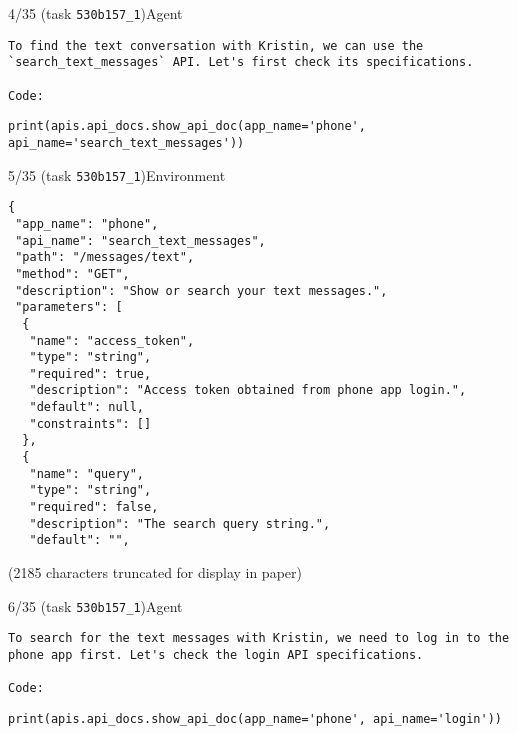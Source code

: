 \begin{minipage}{0.95\linewidth}
\begin{assistant_message_box}{{4/35 (task \texttt{530b157\_1})\hfill Agent}}
\scriptsize
\begin{Verbatim}[breaklines]
To find the text conversation with Kristin, we can use the `search_text_messages` API. Let's first check its specifications.

Code:
\end{Verbatim}
\begin{tcolorbox}[colback=codebgcolor,boxrule=0pt]\begin{Verbatim}[breaklines]
print(apis.api_docs.show_api_doc(app_name='phone', api_name='search_text_messages'))
\end{Verbatim}
\end{tcolorbox}\end{assistant_message_box}
\end{minipage}

\hspace*{8mm}%
\begin{minipage}{0.95\linewidth}
\begin{user_message_box}{{5/35 (task \texttt{530b157\_1})\hfill Environment}}
\scriptsize
\begin{Verbatim}[breaklines]
{
 "app_name": "phone",
 "api_name": "search_text_messages",
 "path": "/messages/text",
 "method": "GET",
 "description": "Show or search your text messages.",
 "parameters": [
  {
   "name": "access_token",
   "type": "string",
   "required": true,
   "description": "Access token obtained from phone app login.",
   "default": null,
   "constraints": []
  },
  {
   "name": "query",
   "type": "string",
   "required": false,
   "description": "The search query string.",
   "default": "",
\end{Verbatim}
(2185 characters truncated for display in paper)\end{user_message_box}
\end{minipage}

\begin{minipage}{0.95\linewidth}
\begin{assistant_message_box}{{6/35 (task \texttt{530b157\_1})\hfill Agent}}
\scriptsize
\begin{Verbatim}[breaklines]
To search for the text messages with Kristin, we need to log in to the phone app first. Let's check the login API specifications.

Code:
\end{Verbatim}
\begin{tcolorbox}[colback=codebgcolor,boxrule=0pt]\begin{Verbatim}[breaklines]
print(apis.api_docs.show_api_doc(app_name='phone', api_name='login'))
\end{Verbatim}
\end{tcolorbox}\end{assistant_message_box}
\end{minipage}

